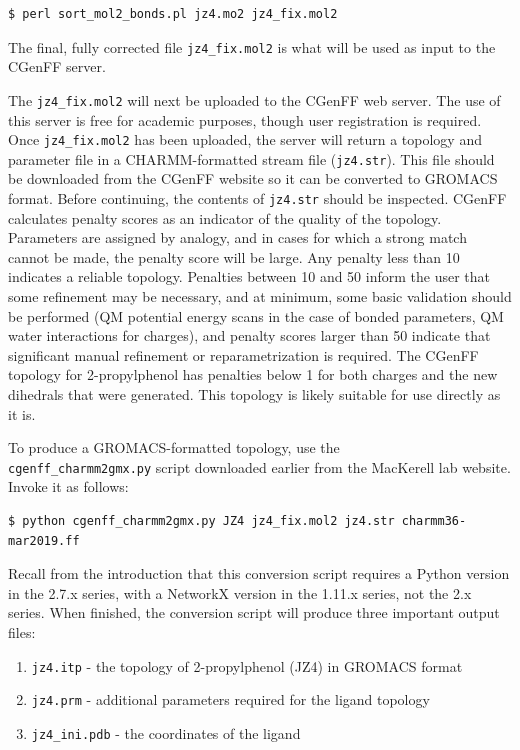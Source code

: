 \documentclass[9pt,tutorial,pubversion]{livecoms}
\begin{document}
\begin{lstlisting}
$ perl sort_mol2_bonds.pl jz4.mo2 jz4_fix.mol2
\end{lstlisting}
%
The final, fully corrected file \texttt{jz4\_fix.mol2} is what will be used as input to the CGenFF server.

The \texttt{jz4\_fix.mol2} will next be uploaded to the CGenFF web server. The use of this server is free for academic purposes, though user registration is required. Once \texttt{jz4\_fix.mol2} has been uploaded, the server will return a topology and parameter file in a CHARMM-formatted stream file (\texttt{jz4.str}). This file should be downloaded from the CGenFF website so it can be converted to GROMACS format. Before continuing, the contents of \texttt{jz4.str} should be inspected. CGenFF calculates penalty scores as an indicator of the quality of the topology. Parameters are assigned by analogy, and in cases for which a strong match cannot be made, the penalty score will be large. Any penalty less than 10 indicates a reliable topology. Penalties between 10 and 50 inform the user that some refinement may be necessary, and at minimum, some basic validation should be performed (QM potential energy scans in the case of bonded parameters, QM water interactions for charges), and penalty scores larger than 50 indicate that significant manual refinement or reparametrization is required. The CGenFF topology for 2-propylphenol has penalties below 1 for both charges and the new dihedrals that were generated. This topology is likely suitable for use directly as it is.

To produce a GROMACS-formatted topology, use the \\\texttt{cgenff\_charmm2gmx.py} script downloaded earlier from the MacKerell lab website. Invoke it as follows:

\begin{lstlisting}
$ python cgenff_charmm2gmx.py JZ4 jz4_fix.mol2 jz4.str charmm36-mar2019.ff
\end{lstlisting}
%
Recall from the introduction that this conversion script requires a Python version in the 2.7.x series, with a NetworkX version in the 1.11.x series, not the 2.x series. When finished, the conversion script will produce three important output files:

\begin{enumerate}
	\item \texttt{jz4.itp} - the topology of 2-propylphenol (JZ4) in GROMACS format
	\item \texttt{jz4.prm} - additional parameters required for the ligand topology
	\item \texttt{jz4\_ini.pdb} - the coordinates of the ligand
\end{enumerate}
\end{document}
